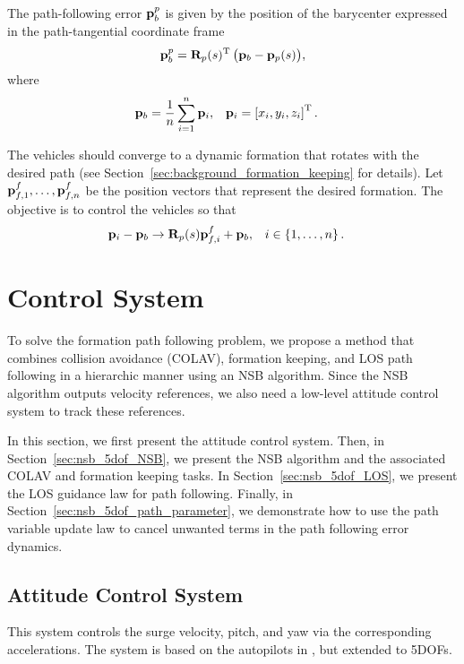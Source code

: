 The path-following error $\mathbf{p}_b^p$ is given by the position of the barycenter expressed in the path-tangential coordinate frame
\begin{equation}
    \mathbf{p}_b^p = \mathbf{R}_p(s)^{\mathrm{T}} \, \big(\mathbf{p}_b - \mathbf{p}_p(s)\big), \label{eq:nsb_5dof_barycenter}
\end{equation}
where
\begin{align}
    \mathbf{p}_b &= \frac{1}{n} \sum_{i=1}^n \mathbf{p}_i, & 
    \mathbf{p}_i &= \left[x_i, y_i, z_i\right]^{\mathrm{T}}.
\end{align}

The vehicles should converge to a dynamic formation that rotates with the desired path (see Section~\ref{sec:background_formation_keeping} for details).
Let $\mathbf{p}_{f,1}^f, \ldots, \mathbf{p}_{f,n}^f$ be the position vectors that represent the desired formation.
The objective is to control the vehicles so that
\begin{align}
    \mathbf{p}_i - \mathbf{p}_b &\rightarrow \mathbf{R}_p(s) \mathbf{p}_{f,i}^f + \mathbf{p}_b, &
    i &\in \left\{1, \ldots, n \right\}.
\end{align}

\section{Control System}
\label{sec:nsb_5dof_control}
To solve the formation path following problem, we propose a method that combines collision avoidance (COLAV), formation keeping, and LOS path following in a hierarchic manner using an NSB algorithm.
Since the NSB algorithm outputs velocity references, we also need a low-level attitude control system to track these references.

In this section, we first present the attitude control system.
Then, in Section~\ref{sec:nsb_5dof_NSB}, we present the NSB algorithm and the associated COLAV and formation keeping tasks.
In Section~\ref{sec:nsb_5dof_LOS}, we present the LOS guidance law for path following.
Finally, in Section~\ref{sec:nsb_5dof_path_parameter}, we demonstrate how to use the path variable update law to cancel unwanted terms in the path following error dynamics.

\subsection{Attitude Control System}
\label{sec:nsb_5dof_ACS}
This system controls the surge velocity, pitch, and yaw via the corresponding accelerations.
The system is based on the autopilots in \cite{moe_LOS_2016}, but extended to 5DOFs.

